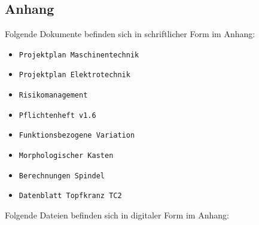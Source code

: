 \newpage
\begin{appendix}
\section{Anhang}
Folgende Dokumente befinden sich in schriftlicher Form im Anhang:

\begin{itemize}
	\item \verb|Projektplan Maschinentechnik|
	\item \verb|Projektplan Elektrotechnik|	
	\item \verb|Risikomanagement|
	\item \verb|Pflichtenheft v1.6|	
	\item \verb|Funktionsbezogene Variation|
	\item \verb|Morphologischer Kasten|	
	\item \verb|Berechnungen Spindel|
	\item \verb|Datenblatt Topfkranz TC2|	
\end{itemize}

Folgende Dateien befinden sich in digitaler Form im Anhang:


\end{appendix}
